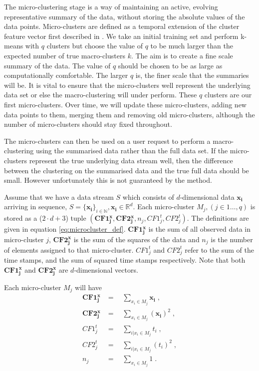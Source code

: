 The micro-clustering stage is a way of maintaining an active, evolving representative summary of the data, without storing the absolute values of the data points. Micro-clusters are defined as a temporal extension of the cluster feature vector first described in \cite{Zhang1996a}.%
We take an initial training set and perform k-means with $q$ clusters but choose the value of $q$ to be much larger than the expected number of true macro-clusters $k$. The aim is to create a fine scale summary of the data. The value of $q$ should be chosen to be as large as computationally comfortable. The larger $q$ is, the finer scale that the summaries will be. It is vital to ensure that the micro-clusters well represent the underlying data set or else the macro-clustering will under perform. These $q$ clusters are our first micro-clusters. Over time, we will update these micro-clusters, adding new data points to them, merging them and removing old micro-clusters, although the number of micro-clusters should stay fixed throughout. 

The micro-clusters can then be used on a user request to perform a macro-clustering using the summarised data rather than the full data set. If the micro-clusters represent the true underlying data stream well, then the difference between the clustering on the summarised data and the true full data should be small. However unfortunately this is not guaranteed by the method.

Assume that we have a data stream $S$ which consists of $d$-dimensional data $\boldsymbol{x_i}$ arriving in sequence, $S = \{\boldsymbol{x_i} \}_{i \in \mathbb{N}}, \boldsymbol{x_i} \in \mathbb{R}^d$. Each micro-cluster $M_j, (j \in 1 \ldots, q)$ is stored as a ($2 \cdot d + 3$) tuple $(\boldsymbol{CF1^x_j}, \boldsymbol{CF2^x_j}, n_j, CF1^t_j, CF2^t_j)$. The definitions are given in equation \eqref{eq:microcluster_def}. $\boldsymbol{CF1^x_j}$ is the sum of all observed data in micro-cluster $j$, $\boldsymbol{CF2^x_j}$ is the sum of the squares of the data and $n_j$ is the number of elements assigned to that micro-cluster. $CF1^t_j$ and $CF2^t_j$ refer to the sum of the time stamps, and the sum of squared time stamps respectively. Note that both $\boldsymbol{CF1^x_j}$ and $\boldsymbol{CF2^x_j}$ are $d$-dimensional vectors.

Each micro-cluster $M_j$ will have 
\begin{align}
\boldsymbol{CF1^x_j} &= \quad \sum_{x_i \in M_j}{\boldsymbol{x_i}} \; , \nonumber  \\ 
\boldsymbol{CF2^x_j} &= \quad \sum_{x_i \in M_j}{(\boldsymbol{x_i})^2} \; , \nonumber\\
CF1^t_j &= \quad \sum_{i | x_i \in M_j}{t_i} \; , \nonumber   \\
CF2^t_j &= \quad\sum_{i | x_i \in M_j}{(t_i)^2} \; , \nonumber\\
n_j &= \quad \sum_{x_i \in M_j}{1} \; .
\label{eq:microcluster_def}
\end{align}


